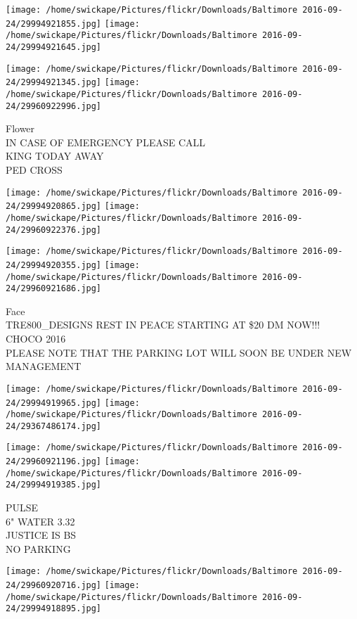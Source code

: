 \documentclass[10pt,letterpaper]{article}
\begin{document}
\texttt{[image: /home/swickape/Pictures/flickr/Downloads/Baltimore 2016-09-24/29994921855.jpg]}
\texttt{[image: /home/swickape/Pictures/flickr/Downloads/Baltimore 2016-09-24/29994921645.jpg]}

\texttt{[image: /home/swickape/Pictures/flickr/Downloads/Baltimore 2016-09-24/29994921345.jpg]}
\texttt{[image: /home/swickape/Pictures/flickr/Downloads/Baltimore 2016-09-24/29960922996.jpg]}

Flower\\
IN CASE OF EMERGENCY PLEASE CALL\\
KING TODAY AWAY\\
PED CROSS
\pagebreak

\texttt{[image: /home/swickape/Pictures/flickr/Downloads/Baltimore 2016-09-24/29994920865.jpg]}
\texttt{[image: /home/swickape/Pictures/flickr/Downloads/Baltimore 2016-09-24/29960922376.jpg]}

\texttt{[image: /home/swickape/Pictures/flickr/Downloads/Baltimore 2016-09-24/29994920355.jpg]}
\texttt{[image: /home/swickape/Pictures/flickr/Downloads/Baltimore 2016-09-24/29960921686.jpg]}

Face\\
TRE800\_DESIGNS REST IN PEACE STARTING AT \$20 DM NOW!!!\\
CHOCO 2016\\
PLEASE NOTE THAT THE PARKING LOT WILL SOON BE UNDER NEW MANAGEMENT
\pagebreak

\texttt{[image: /home/swickape/Pictures/flickr/Downloads/Baltimore 2016-09-24/29994919965.jpg]}
\texttt{[image: /home/swickape/Pictures/flickr/Downloads/Baltimore 2016-09-24/29367486174.jpg]}

\texttt{[image: /home/swickape/Pictures/flickr/Downloads/Baltimore 2016-09-24/29960921196.jpg]}
\texttt{[image: /home/swickape/Pictures/flickr/Downloads/Baltimore 2016-09-24/29994919385.jpg]}

PULSE\\
6" WATER 3.32\\
JUSTICE IS BS\\
NO PARKING
\pagebreak

\texttt{[image: /home/swickape/Pictures/flickr/Downloads/Baltimore 2016-09-24/29960920716.jpg]}
\texttt{[image: /home/swickape/Pictures/flickr/Downloads/Baltimore 2016-09-24/29994918895.jpg]}
\end{document}
